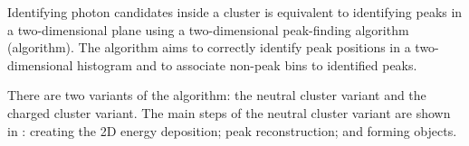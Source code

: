 





Identifying photon candidates inside a cluster is equivalent to identifying peaks in a two-dimensional plane using a two-dimensional peak-finding algorithm (\peakFinding algorithm). The \peakFinding algorithm aims to correctly identify peak positions in a two-dimensional histogram and to associate non-peak bins to identified peaks.


There are two variants of the \peakFinding algorithm: the neutral cluster variant and the charged cluster variant. The main steps of the neutral cluster variant are shown in : creating the 2D  energy deposition; peak reconstruction; and forming \ShowerPeak objects.


